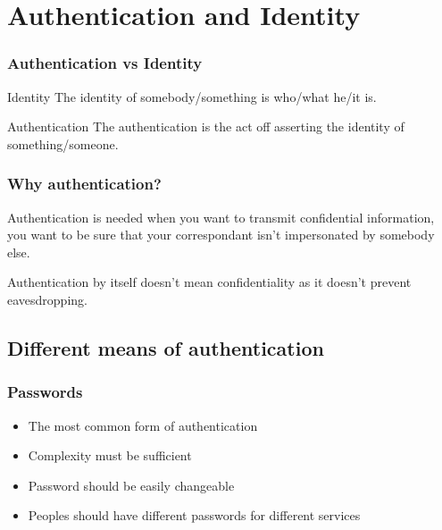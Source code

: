 \section{Authentication and Identity}

\begin{frame}
\frametitle{Authentication vs Identity}
\begin{block}{Identity}
The identity of somebody/something is who/what he/it is.
\end{block}
\begin{block}{Authentication} The authentication is the act off asserting the
identity of something/someone.
\end{block}
\end{frame}


\begin{frame}
\frametitle{Why authentication?}

Authentication is needed when you want to transmit confidential
information, you want to be sure that your correspondant isn't
impersonated by somebody else.

Authentication by itself doesn't mean confidentiality as it doesn't
prevent eavesdropping.

\end{frame}


\subsection{Different means of authentication}

\begin{frame}
\frametitle{Passwords}

\begin{itemize}
\item The most common form of authentication
\item Complexity must be sufficient
\item Password should be easily changeable
\item Peoples should have different passwords for different services
\end{itemize}

\end{frame}


